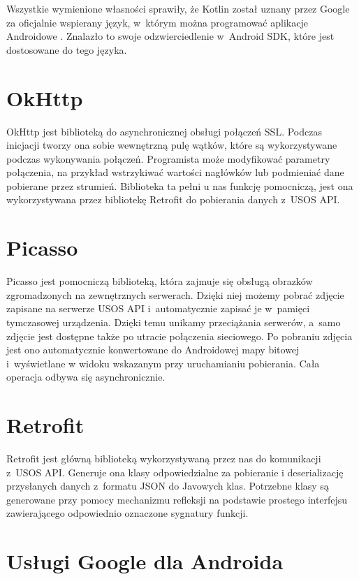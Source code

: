 \documentclass{pracamgr}
\begin{document}
Wszystkie wymienione własności sprawiły, że Kotlin został uznany przez
Google za oficjalnie wspierany język, w~którym można programować aplikacje
Androidowe \cite{kotlinandroid}. Znalazło to swoje odzwierciedlenie w~Android SDK,
które jest dostosowane do tego języka.

\section{OkHttp}

OkHttp \cite{okhttp} jest biblioteką do asynchronicznej obsługi połączeń SSL.
Podczas inicjacji tworzy ona sobie wewnętrzną pulę wątków, które są wykorzystywane
podczas wykonywania połączeń. Programista może modyfikować parametry połączenia,
na przykład wstrzykiwać wartości nagłówków lub podmieniać dane pobierane przez
strumień. Biblioteka ta pełni u nas funkcję pomocniczą, jest ona wykorzystywana
przez bibliotekę Retrofit do pobierania danych z~USOS API.

\section{Picasso}

Picasso \cite{picasso} jest pomocniczą biblioteką, która zajmuje się obsługą
obrazków zgromadzonych na zewnętrznych serwerach. Dzięki niej możemy pobrać
zdjęcie zapisane na serwerze USOS API i~automatycznie zapisać je w~pamięci
tymczasowej urządzenia. Dzięki temu unikamy przeciążania serwerów, a~samo zdjęcie
jest dostępne także po utracie połączenia sieciowego. Po pobraniu zdjęcia
jest ono automatycznie konwertowane do Androidowej mapy bitowej i~wyświetlane w
widoku wskazanym przy uruchamianiu pobierania. Cała operacja odbywa się asynchronicznie.

\section{Retrofit}

Retrofit \cite{retrofit} jest główną biblioteką wykorzystywaną przez nas do
komunikacji z~USOS API. Generuje ona klasy odpowiedzialne za pobieranie i
deserializację przysłanych danych z~formatu JSON do Javowych klas. Potrzebne klasy
są generowane przy pomocy mechanizmu refleksji na podstawie prostego interfejsu
zawierającego odpowiednio oznaczone sygnatury funkcji.

\section{Usługi Google dla Androida}
\end{document}
